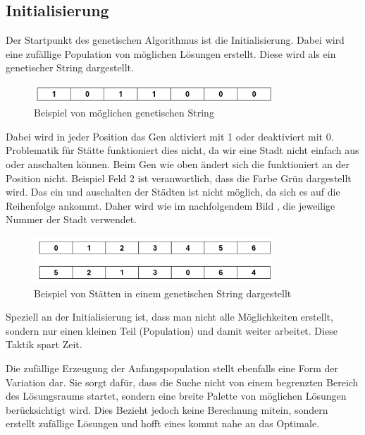 %
%
%
%
\subsection{Initialisierung
\label{genetic_algorithm:initialization}}
Der Startpunkt des genetischen Algorithmus ist die Initialisierung.
Dabei wird eine zufällige Population von möglichen Lösungen erstellt.
Diese wird als ein genetischer String dargestellt.

\begin{figure} [h]
	\centering
	\includegraphics[width=0.8\textwidth]{
        papers/variationsprinzip_algorithmen/images/teil3/01_genetic_string.png
        }
	\caption{Beispiel von möglichen genetischen String}
	\label{fig:possible_genetic_string}
\end{figure}

Dabei wird in jeder Position das Gen aktiviert mit 1 oder deaktiviert mit 0.
Problematik für Stätte funktioniert dies nicht, da wir eine Stadt nicht
einfach aus oder anschalten können. Beim Gen wie oben ändert sich die funktioniert
an der Position nicht. Beispiel Feld 2 ist veranwortlich, dass die Farbe Grün
dargestellt wird. Das ein und auschalten der Städten ist nicht möglich, da sich
es auf die Reihenfolge ankommt. Daher wird wie im nachfolgendem Bild 
\cite{cities_genetic_string}, die jeweilige Nummer der Stadt verwendet.

\begin{figure} [h]
	\centering
	\includegraphics[width=0.8\textwidth]{
        papers/variationsprinzip_algorithmen/images/teil3/02_genetic_string_cities.png
        }
	\caption{Beispiel von Stätten in einem genetischen String dargestellt}
	\label{fig:cities_genetic_string}
\end{figure}

Speziell an der Initialisierung ist, dass man nicht alle Möglichkeiten erstellt,
sondern nur einen kleinen Teil (Population) und damit weiter arbeitet. Diese 
Taktik spart Zeit. 

Die zufällige Erzeugung der Anfangspopulation stellt ebenfalls eine Form der 
Variation dar. Sie sorgt dafür, dass die Suche nicht von einem begrenzten 
Bereich des Lösungsraums startet, sondern eine breite Palette von möglichen 
Lösungen berücksichtigt wird. Dies Bezieht jedoch keine Berechnung mitein,
sondern erstellt zufällige Lösungen und hofft eines kommt nahe an das 
Optimale.
